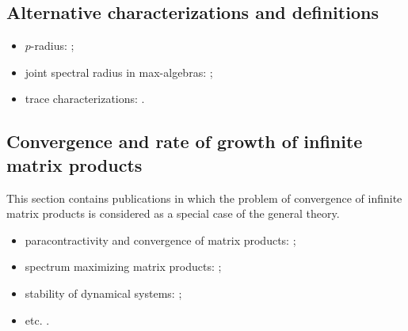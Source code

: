 \documentclass[a4paper,fleqn]{article}
\let\cite=\citep
\begin{document}
\subsection*{Alternative characterizations and definitions}
\begin{itemize}
  \item $p$-radius: \cite{BhaBha:SM95, JP:CDC10, JunProt:SIAMJSC11,
          Morris:SIAMJMAA22, OgurJung:CDC14, OgurMart:LAA14, OPJ:SCL16,
          Prot:LAA08, Prot:CDC05-2, Muller:APM97, Morris:AM16};
  \item joint spectral radius in max-algebras: \cite{Bapat:LAA98,
          BGT:IEEETAC00, DGM:LIPICS17, Gaubert:IEEETAC95, GMW:LAA17,
          GurMas:LAA11, Lur:LAA05, Lur:LAA06-1, LurYang:LAA09, MulPep:LAA13,
          Pep:LAA08, Pep:LAA11};
  \item trace characterizations: \cite{ChenZhou:LAA00, Xu:EJLA10}.
\end{itemize}

\subsection*{Convergence and rate of growth of infinite matrix products}
This section contains publications in which the problem of convergence
of infinite matrix products is considered as a special case of the
general theory.

\begin{itemize}
  \item paracontractivity and convergence of matrix products: \cite{BeynEls96,
          BE:EJLA97, NeuSch:ArXiv98, VEB:LAA00, Mojskerc:LAA14, WangCheng:LMA16};
  \item spectrum maximizing matrix products: \cite{BochiLas:SAIMJMAA24,
          CGSZ:LAA10, JSRpack, GugProt:SIAMJMAA16, GugZen:LAA08, Koz:SAIMJMAA25,
          Laskawiec:LAA25, Vladimirov:ArXiv24};
  \item stability of dynamical systems: \cite{Ahmadi08, AhmPar:CDC05,
          Bar:CDC05, BrayTong:TCS79, BrayTong:TCS80, GugZen:LNM14,
          Koz:AiT90:10:e, AKKK:92:e, ShihWP:LAA97, SBKK:CDC97, Shih:LAA99,
          KasBh:2000, BTV:MTNS02};
  \item etc. \cite{AndoShih:SIAM:98, BerWang:LAA92, BEN:ETNA94, CiconePhD11,
          Cohen:MPCPS79, DaubLag:LAA92, DaubLag:LAA01, EF:LAA97, FLS:ETDS19,
          GugZen:LAA01, GurRod:SIAMJMAA97, GugZen:LAA03, Hajnal:MPCPS76,
          Hartfiel02, Holtz:EJLA00, HR:APM12, Koz:DDNS18, Koz:ArXiv20,
          Mate:PAMS98, Mate:FM99, NSch:LAA99, PJ:LAA13, Shen:LAA00,
          ShihPang:AJIFAC08, SU:SIAMJMAA94, Thomas:Arxiv18, Thomas:ArXiv22,
          Vlad:ArXiv16}.
\end{itemize}
\end{document}
